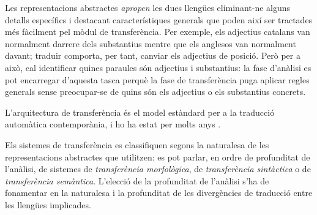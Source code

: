 Les representacions abstractes \emph{apropen} les dues llengües
eliminant-ne alguns detalls específics i destacant característiques
generals que poden així ser tractades més fàcilment pel mòdul de
transferència. Per exemple, els adjectius catalans van normalment
darrere dels substantius mentre que els anglesos van normalment
davant; traduir comporta, per tant, canviar els adjectius de
posició. Però per a això, cal identificar quines paraules són
adjectius i substantius: la fase d'anàlisi es pot encarregar d'aquesta
tasca perquè la fase de transferència puga aplicar regles generals
sense preocupar-se de quins són els adjectius o els substantius
concrets.


L'arquitectura de transferència és el model estàndard 
per a la traducció automàtica contemporània, i ho ha estat
per molts anys \citep{arnold93j}.

Els sistemes de transferència es classifiquen segons la naturalesa de
les representacions abstractes que utilitzen: es pot parlar, en ordre de
profunditat de l'anàlisi, de sistemes de \emph{transferència
morfològica}, de \emph{transferència sintàctica} o de {\em
transferència semàntica}.
L'elecció de la profunditat de l'anàlisi s'ha de fonamentar en la
naturalesa i la profunditat de les divergències de traducció
\citep{vandooren93b} entre les llengües implicades.

